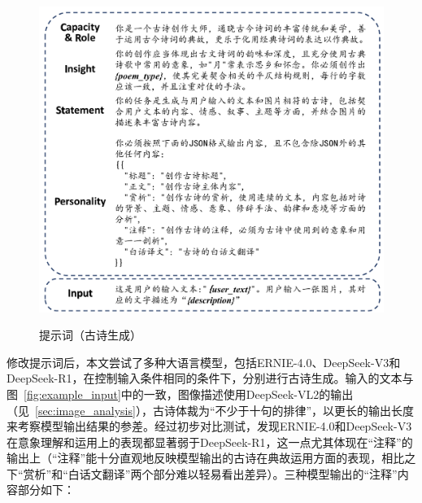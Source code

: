 \begin{figure}[ht]
  \centering
  \includegraphics[width=1\textwidth]
  {figures/Prompt_古诗生成.pdf}\\
  \caption{提示词（古诗生成）}
  \label{fig:prompt_poem_generation} %
\end{figure}

修改提示词后，本文尝试了多种大语言模型，包括ERNIE-4.0、DeepSeek-V3和DeepSeek-R1，在控制输入条件相同的条件下，分别进行古诗生成。输入的文本与图~\ref{fig:example_input}中的一致，图像描述使用DeepSeek-VL2的输出（见~\ref{sec:image_analysis}），古诗体裁为“{\kaishu 不少于十句的排律}”，以更长的输出长度来考察模型输出结果的参差。经过初步对比测试，发现ERNIE-4.0和DeepSeek-V3在意象理解和运用上的表现都显著弱于DeepSeek-R1，这一点尤其体现在“注释”的输出上（“注释”能十分直观地反映模型输出的古诗在典故运用方面的表现，相比之下“赏析”和“白话文翻译”两个部分难以轻易看出差异）。三种模型输出的“注释”内容部分如下：

